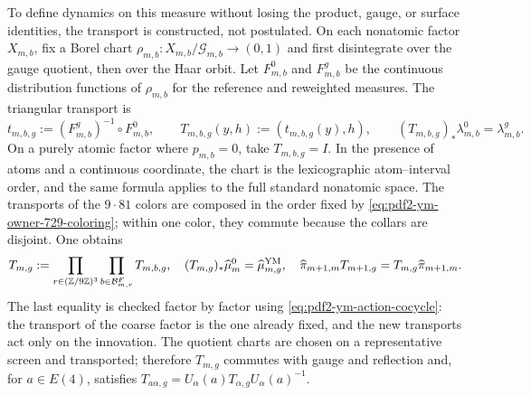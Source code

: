 To define dynamics on this measure without losing the product, gauge, or
surface identities, the transport is constructed, not postulated. On each
nonatomic factor $X_{m,b}$, fix a Borel chart
$\rho_{m,b}:X_{m,b}/\mathcal G_{m,b}\to(0,1)$ and first disintegrate over the
gauge quotient, then over the Haar orbit. Let $F_{m,b}^0$ and
$F_{m,b}^g$ be the continuous distribution functions of $\rho_{m,b}$ for the
reference and reweighted measures. The triangular transport is
\begin{equation}\label{eq:pdf2-ym-gibbs-transport-factor}
 t_{m,b,g}:=(F_{m,b}^g)^{-1}\circ F_{m,b}^0,
 \qquad
 T_{m,b,g}(y,h):=(t_{m,b,g}(y),h),
 \qquad
 (T_{m,b,g})_*\lambda_{m,b}^0=\lambda_{m,b}^g.
\end{equation}
On a purely atomic factor where $p_{m,b}=0$, take
$T_{m,b,g}=I$. In the presence of atoms and a continuous coordinate, the chart is the
lexicographic atom--interval order, and the same formula applies to the full
standard nonatomic space. The transports of the $9\cdot81$ colors are composed
in the order fixed by \eqref{eq:pdf2-ym-owner-729-coloring}; within one color,
they commute because the collars are disjoint. One obtains
\begin{equation}\label{eq:pdf2-ym-gibbs-transport-global}
 T_{m,g}:=\prod_{r\in(\mathbb Z/9\mathbb Z)^3}
           \prod_{b\in\mathcal B_{m,r}^{F}}T_{m,b,g},
 \quad
 (T_{m,g})_*\widehat\mu_m^0=\widehat\mu_{m,g}^{\rm YM},
 \quad
 \widehat\pi_{m+1,m}T_{m+1,g}=T_{m,g}\widehat\pi_{m+1,m}.
\end{equation}
The last equality is checked factor by factor using
\eqref{eq:pdf2-ym-action-cocycle}: the transport of the coarse factor is the one already fixed, and
the new transports act only on the innovation. The quotient charts are
chosen on a representative screen and transported; therefore $T_{m,g}$ commutes with
gauge and reflection and, for $a\in E(4)$, satisfies
$T_{a\alpha,g}=U_\alpha(a)T_{\alpha,g}U_\alpha(a)^{-1}$.

